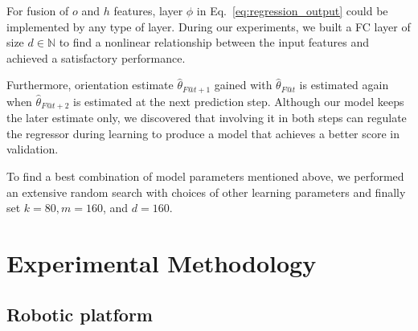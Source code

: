 \documentclass[letterpaper, 10 pt, conference]{ieeeconf}  %
\begin{document}
\begin{itemize}
            For fusion of $o$ and $h$ features, layer $\phi$ in
            Eq.~\eqref{eq:regression_output} could be implemented by any
            type of layer. During our experiments, we built a FC layer
            of size $d \in \mathbb{N}$ to find a nonlinear relationship
            between the input features and achieved a satisfactory
            performance.

            Furthermore, orientation estimate $\hat{\theta}_{F@t+1}$
            gained with $\hat{\theta}_{F@t}$ is estimated again when
            $\hat{\theta}_{F@t+2}$ is estimated at the next prediction
            step. Although our model keeps the later estimate only, we
            discovered that involving it in both steps can regulate the
            regressor during learning to produce a model that achieves a
            better score in validation.

    \end{itemize}
    To find a best combination of model parameters mentioned above, we
    performed an extensive random search with choices of other learning
    parameters and finally set $k=80, m=160$, and $d=160$.

	\section{Experimental Methodology}
	\label{sec:experiments}

    \subsection{Robotic platform}
\end{document}
